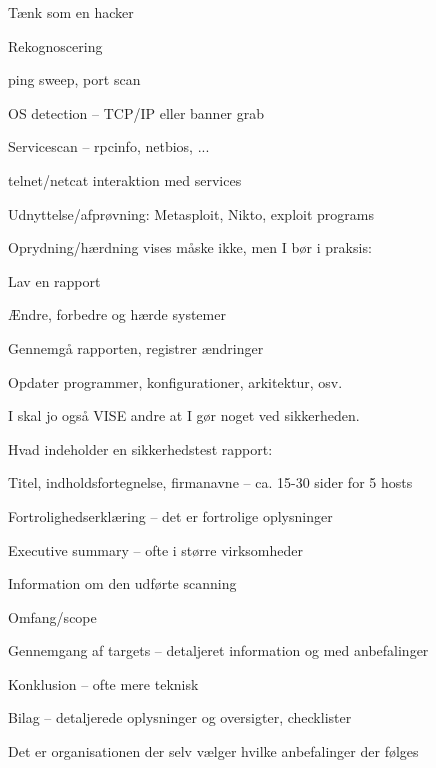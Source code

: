 \documentclass[Screen16to9,17pt]{foils}
\begin{document}





\begin{list1}
\item Tænk som en hacker
\item Rekognoscering
\begin{list2}
\item ping sweep, port scan
\item OS detection -- TCP/IP eller banner grab
\item Servicescan -- rpcinfo, netbios, ...
\item telnet/netcat interaktion med services
\end{list2}
\item Udnyttelse/afprøvning: Metasploit, Nikto, exploit programs
\item Oprydning/hærdning vises måske ikke, men I bør i praksis:
\begin{list2}
\item Lav en rapport
\item Ændre, forbedre og hærde systemer
\item Gennemgå rapporten, registrer ændringer
\item Opdater programmer, konfigurationer, arkitektur, osv.
\end{list2}
\item I skal jo også VISE andre at I gør noget ved sikkerheden.
\end{list1}



\begin{list1}
\item Hvad indeholder en sikkerhedstest rapport:
\begin{list2}
\item Titel, indholdsfortegnelse, firmanavne -- ca. 15-30 sider for 5 hosts
\item Fortrolighedserklæring -- det er fortrolige oplysninger
\item Executive summary -- ofte i større virksomheder
\item Information om den udførte scanning
\item Omfang/scope
\item Gennemgang af targets -- detaljeret information og med anbefalinger
\item Konklusion -- ofte mere teknisk
\item Bilag -- detaljerede oplysninger og oversigter, checklister
\end{list2}
\item Det er organisationen der selv vælger hvilke anbefalinger der følges
\end{list1}
\end{document}
